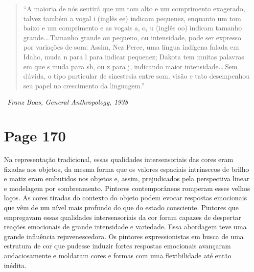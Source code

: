 \documentclass[a4paper]{article}
\begin{document}
\begin{quote}
``A maioria de nós sentirá que um tom alto e um comprimento exagerado, talvez também a vogal i (inglês ee) indicam pequenez, enquanto um tom baixo e um comprimento e as vogais a, o, u (inglês oo) indicam tamanho grande.\ldots Tamanho grande ou pequeno, ou intensidade, pode ser expresso por variações de som. Assim, Nez Perce, uma língua indígena falada em Idaho, muda n para l para indicar pequenez; Dakota tem muitas palavras em que s muda para sh, ou z para j, indicando maior intensidade.\ldots Sem dúvida, o tipo particular de sinestesia entre som, visão e tato desempenhou seu papel no crescimento da linguagem.''
\end{quote}

\small\textbullet\ \textit{Franz Boas, General Anthropology, 1938}

\newpage
\section*{Page 170}

Na representação tradicional, essas qualidades intersensoriais das cores eram fixadas aos objetos, da mesma forma que os valores espaciais intrínsecos de brilho e matiz eram embutidos nos objetos e, assim, prejudicados pela perspectiva linear e modelagem por sombreamento. Pintores contemporâneos romperam esses velhos laços. As cores tiradas do contexto do objeto podem evocar respostas emocionais que vêm de um nível mais profundo do que do estado consciente. Pintores que empregavam essas qualidades intersensoriais da cor foram capazes de despertar reações emocionais de grande intensidade e variedade. Essa abordagem teve uma grande influência rejuvenescedora. Os pintores expressionistas em busca de uma estrutura de cor que pudesse induzir fortes respostas emocionais avançaram audaciosamente e moldaram cores e formas com uma flexibilidade até então inédita.
\end{document}
